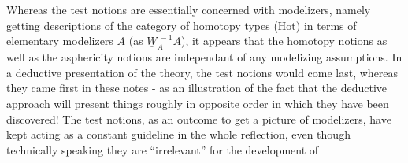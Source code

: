 Whereas the test notions are essentially concerned with modelizers,
namely getting descriptions of the category of homotopy types (Hot)  in
terms of elementary modelizers $A\hat{}$ (as  $\underline{W}_A^{\ -1}A\hat{}$),  it appears that the
homotopy notions\hand{,} as well as the asphericity notions\hand{,} are independant of
any modelizing  assumptions.  In a deductive presentation of the theory,
the test notions would come last,  whereas they came first in these notes
-  as an illustration of the  fact that the deductive approach will present
things roughly in opposite order in which they have been discovered!  The
test notions,  as an outcome  to get a picture of modelizers,  have kept
acting as a constant  guideline in the whole reflection,  even
though technically speaking they are ``irrelevant'' for the development of
